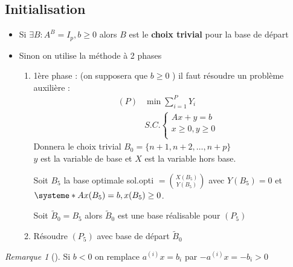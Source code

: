 \documentclass{article}
\theoremstyle{plain}%
\theoremstyle{definition}
\theoremstyle{remark}
\newtheorem*{rem}{Remarque}
\begin{document}
\subsection{Initialisation}
\begin{itemize}
    \item Si $ \exists B : A^B = I_p, b \geq 0 $ alors $ B $ est le \textbf{choix trivial} pour la base de départ
    \item Sinon on utilise la méthode à 2 phases 
    \begin{enumerate}
        \item 1ère phase : (on supposera que $ b \geq 0 $ ) il faut résoudre un problème auxilière : 
        \begin{align*}
            (P) &\min \sum_{i=1}^{P}Y_i \\
                & S.C. \begin{cases}
                Ax+y = b &\\
                x \geq 0, y \geq 0 &\\
                \end{cases} 
        \end{align*}
        Donnera le choix trivial $ B_0 = \{n+1, n+2, \dots, n+p\} $ \\
        $ y $ est la variable de base et $ X $ est la variable hors base.

        Soit $ B_5 $ la base optimale sol.opti $ = \binom{X(B_5)}{Y(B_5)} $ avec $ Y(B_5) = 0 $ et $ \systeme*{Ax(B_5) = b, x(B_5) \geq 0} $.

        Soit $ \tilde{B}_0 = B_5 $ alors $ \tilde{B}_0 $ est une base réalisable pour $ (P_5) $ 
        
        \item Résoudre $ (P_5) $ avec base de départ $ \tilde{B}_0 $ 
    \end{enumerate}
\end{itemize}

\begin{rem}[]
    Si $ b < 0 $ on remplace $ a^{(i)} x = b_i $ par $ -a^{(i)} x = - b_i > 0 $ 
\end{rem}
\end{document}

